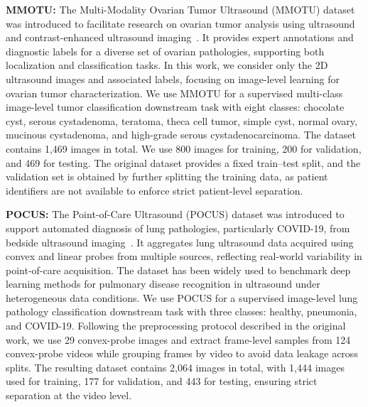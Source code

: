 \documentclass{article}
\theoremstyle{plain}
\theoremstyle{definition}
\theoremstyle{remark}
\begin{document}
\textbf{MMOTU:} The Multi-Modality Ovarian Tumor Ultrasound (MMOTU) dataset was introduced to facilitate research on ovarian tumor analysis using ultrasound and contrast-enhanced ultrasound imaging~\cite{zhao2023mmotu}. It provides expert annotations and diagnostic labels for a diverse set of ovarian pathologies, supporting both localization and classification tasks. In this work, we consider only the 2D ultrasound images and associated labels, focusing on image-level learning for ovarian tumor characterization. We use MMOTU for a supervised multi-class image-level tumor classification downstream task with eight classes: chocolate cyst, serous cystadenoma, teratoma, theca cell tumor, simple cyst, normal ovary, mucinous cystadenoma, and high-grade serous cystadenocarcinoma. The dataset contains 1,469 images in total. We use 800 images for training, 200 for validation, and 469 for testing. The original dataset provides a fixed train–test split, and the validation set is obtained by further splitting the training data, as patient identifiers are not available to enforce strict patient-level separation.


\textbf{POCUS:} The Point-of-Care Ultrasound (POCUS) dataset was introduced to support automated diagnosis of lung pathologies, particularly COVID-19, from bedside ultrasound imaging~\cite{Born2021AcceleratingAnalysis}. It aggregates lung ultrasound data acquired using convex and linear probes from multiple sources, reflecting real-world variability in point-of-care acquisition. The dataset has been widely used to benchmark deep learning methods for pulmonary disease recognition in ultrasound under heterogeneous data conditions. We use POCUS for a supervised image-level lung pathology classification downstream task with three classes: healthy, pneumonia, and COVID-19. Following the preprocessing protocol described in the original work, we use 29 convex-probe images and extract frame-level samples from 124 convex-probe videos while grouping frames by video to avoid data leakage across splits. The resulting dataset contains 2,064 images in total, with 1,444 images used for training, 177 for validation, and 443 for testing, ensuring strict separation at the video level.
\end{document}
